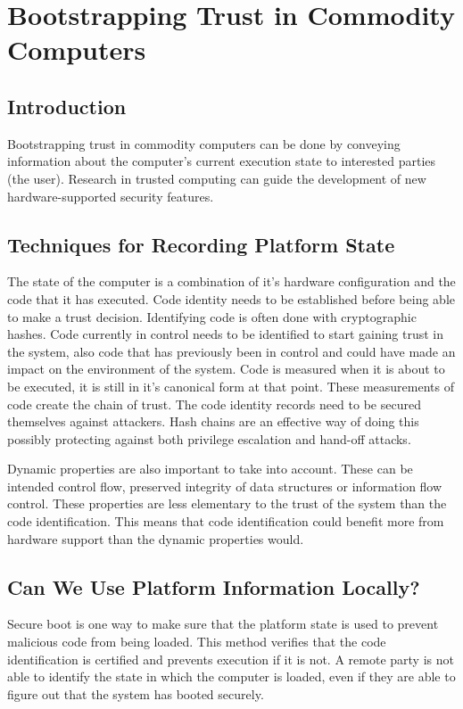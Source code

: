 \documentclass{article}
\begin{document}
\section{Bootstrapping Trust in Commodity Computers}

\subsection{Introduction}

Bootstrapping trust in commodity computers can be done by conveying information about the computer's current execution state to interested parties (the user). Research in trusted computing can guide the development of new hardware-supported security features.

\subsection{Techniques for Recording Platform State}

The state of the computer is a combination of it's hardware configuration and the code that it has executed. Code identity needs to be established before being able to make a trust decision. Identifying code is often done with cryptographic hashes. Code currently in control needs to be identified to start gaining trust in the system, also code that has previously been in control and could have made an impact on the environment of the system. Code is measured when it is about to be executed, it is still in it's canonical form at that point. These measurements of code create the chain of trust. The code identity records need to be secured themselves against attackers. Hash chains are an effective way of doing this possibly protecting against both privilege escalation and hand-off attacks. 
\medskip

Dynamic properties are also important to take into account. These can be intended control flow, preserved integrity of data structures or information flow control. These properties are less elementary to the trust of the system than the code identification. This means that code identification could benefit more from hardware support than the dynamic properties would.

\subsection{Can We Use Platform Information Locally?}

Secure boot is one way to make sure that the platform state is used to prevent malicious code from being loaded. This method verifies that the code identification is certified and prevents execution if it is not. A remote party is not able to identify the state in which the computer is loaded, even if they are able to figure out that the system has booted securely. 
\medskip
\end{document}
